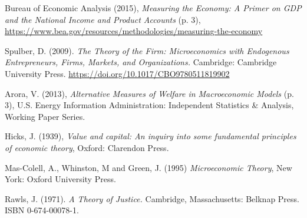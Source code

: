 \documentclass{journal}
\theoremstyle{plain}
\theoremstyle{definition}
\theoremstyle{remark}
\begin{document}
\begin{thebibliography}{9}

Bureau of Economic Analysis (2015),
\emph{Measuring the Economy: A Primer on GDP and the National Income and Product Accounts} (p. 3),
\url{https://www.bea.gov/resources/methodologies/measuring-the-economy}

Spulber, D. (2009).
\emph{The Theory of the Firm: Microeconomics with Endogenous Entrepreneurs, Firms, Markets, and Organizations.}
Cambridge: Cambridge University Press. 
\url{https://doi.org/10.1017/CBO9780511819902}

Arora, V. (2013),
\emph{Alternative Measures of Welfare in Macroeconomic Models} (p. 3),
U.S. Energy Information Administration: 
Independent Statistics \& Analysis, Working Paper Series.

Hicks, J. (1939), 
\emph{Value and capital: An inquiry into some fundamental principles of economic theory}, 
Oxford: Clarendon Press.

Mas-Colell, A., Whinston, M and Green, J. (1995) 
\emph{Microeconomic Theory}, 
New York: Oxford University Press.

Rawls, J. (1971).
\emph{A Theory of Justice.}
Cambridge, Massachusetts: Belknap Press.
ISBN 0-674-00078-1.

\end{thebibliography}
\end{document}
